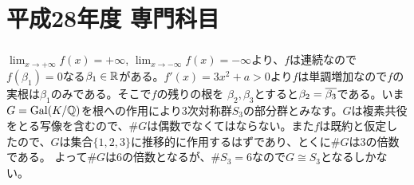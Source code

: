 \section{平成28年度 専門科目}

\subsubsection{} %
\begin{sol}
  $\lim_{x \to + \infty} f(x) = + \infty$, $\lim_{x \to - \infty} f(x) = - \infty$より、$f$は連続なので$f(\beta_1) = 0$なる$\beta_1 \in {\mathbb R}$がある。$f'(x) = 3x^2 + a > 0$より$f$は単調増加なので$f$の実根は$\beta_1$のみである。そこで$f$の残りの根を
  $\beta_2, \beta_3$とすると$\beta_2 = \overline{\beta_3}$である。いま$G = \operatorname{Gal}(K/{\mathbb Q})$を根への作用により3次対称群$S_3$の部分群とみなす。$G$は複素共役をとる写像を含むので、$\# G$は偶数でなくてはならない。また$f$は既約と仮定したので、$G$は集合$\{ 1,2,3\}$に推移的に作用するはずであり、とくに$\# G$は$3$の倍数である。
  よって$\# G$は$6$の倍数となるが、$\# S_3 = 6$なので$G \cong S_3$となるしかない。
\end{sol}

\newpage

